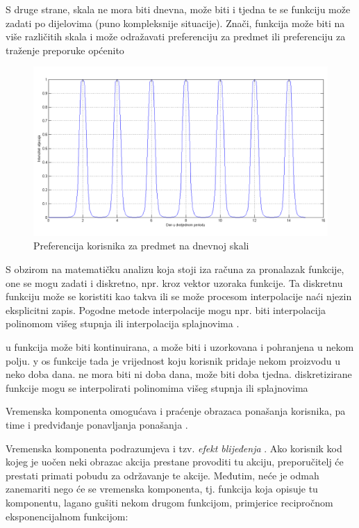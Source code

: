 \documentclass[times, utf8, diplomski, numeric]{fer}
\begin{document}
S druge strane, skala ne mora biti dnevna, može biti i tjedna te se funkciju
može zadati po dijelovima (puno kompleksnije situacije). 
Znači, funkcija može biti na više različitih skala i može odražavati
preferenciju za predmet ili preferenciju za traženje preporuke općenito
\begin{figure}[htb]
	\centering
	\includegraphics[width=14.21cm]{images/neprigusenocropped.png}
	\caption{Preferencija korisnika za predmet na dnevnoj skali}
	\label{fig:Gauss2}
\end{figure}

S obzirom na matematičku analizu koja stoji iza računa za pronalazak funkcije,
one se mogu zadati i diskretno, npr. kroz vektor uzoraka funkcije. Ta diskretnu
funkciju može se koristiti kao takva ili se može procesom interpolacije naći
njezin eksplicitni zapis. Pogodne metode interpolacije mogu npr. biti
interpolacija polinomom višeg stupnja ili interpolacija splajnovima
.

u funkcija može biti kontinuirana, a može biti i uzorkovana i
pohranjena u nekom polju. y os funkcije tada je vrijednost koju korisnik
pridaje nekom proizvodu u neko doba dana. ne mora biti ni doba dana, može biti
doba tjedna. diskretizirane funkcije mogu se interpolirati polinomima višeg
stupnja ili splajnovima

Vremenska komponenta omogućava i praćenje obrazaca ponašanja korisnika, pa time
i predviđanje ponavljanja ponašanja .

Vremenska komponenta podrazumjeva i tzv. \emph{efekt blijeđenja} . Ako korisnik kod kojeg je uočen neki obrazac akcija prestane provoditi
tu akciju, preporučitelj će prestati primati pobudu za održavanje te akcije.
Međutim, neće je odmah zanemariti nego će se vremenska komponenta, tj. funkcija
koja opisuje tu komponentu, lagano gušiti nekom drugom funkcijom, primjerice
recipročnom eksponencijalnom funkcijom:
\end{document}
